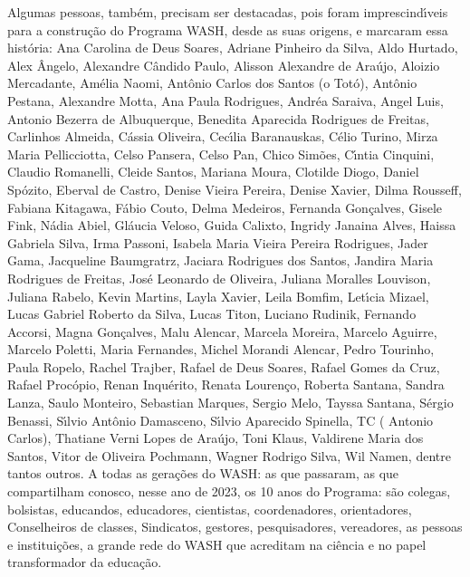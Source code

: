 \begin{agradecimentos}
Algumas pessoas, tamb\'em, precisam ser destacadas, pois foram imprescind\'{\i}veis para a constru\c{c}\~ao do Programa WASH, desde as suas origens, e marcaram essa hist\'oria: Ana Carolina de Deus Soares, Adriane Pinheiro da Silva, Aldo Hurtado, Alex \^Angelo, Alexandre C\^andido Paulo, Alisson Alexandre de Ara\'ujo, Aloizio Mercadante, Am\'elia Naomi, Ant\^onio Carlos dos Santos (o Tot\'o), Ant\^onio Pestana, Alexandre Motta, Ana Paula Rodrigues, Andr\'ea Saraiva, Angel Luis, Antonio Bezerra de Albuquerque, Benedita Aparecida Rodrigues de Freitas, Carlinhos Almeida, C\'assia Oliveira, Cec\'{\i}lia Baranauskas, C\'elio Turino, Mirza Maria Pellicciotta, Celso Pansera, Celso Pan, Chico Sim\~oes, C\'{\i}ntia Cinquini, Claudio Romanelli, Cleide Santos, Mariana Moura, Clotilde Diogo, Daniel Sp\'ozito, Eberval de Castro, Denise  Vieira Pereira, Denise Xavier, Dilma Rousseff,  Fabiana Kitagawa, F\'abio Couto, Delma  Medeiros, Fernanda Gon\c{c}alves, Gisele Fink, N\'adia Abiel, Gl\'aucia Veloso, Guida Calixto,  Ingridy Janaina Alves, Haissa Gabriela Silva, Irma Passoni, Isabela Maria Vieira Pereira Rodrigues, Jader Gama, Jacqueline Baumgratrz, Jaciara Rodrigues dos Santos, Jandira Maria Rodrigues de Freitas, Jos\'e Leonardo de Oliveira, Juliana Moralles Louvison, Juliana Rabelo, Kevin Martins, Layla Xavier, Leila Bomfim, Let\'{\i}cia Mizael, Lucas Gabriel Roberto da Silva, Lucas Titon, Luciano Rudinik, Fernando Accorsi, Magna Gon\c{c}alves, Malu Alencar, Marcela Moreira, Marcelo Aguirre, Marcelo Poletti, Maria Fernandes, Michel Morandi Alencar, Pedro Tourinho, Paula Ropelo, Rachel Trajber, Rafael de Deus Soares, Rafael Gomes da Cruz, Rafael Proc\'opio, Renan Inqu\'erito, Renata Louren\c{c}o, Roberta Santana,  Sandra Lanza, Saulo Monteiro, Sebastian Marques, Sergio Melo, Tayssa Santana,  S\'ergio Benassi, S\'{\i}lvio Ant\^onio Damasceno, S\'{\i}lvio Aparecido Spinella, TC ( Antonio Carlos), Thatiane Verni Lopes de Ara\'ujo, Toni Klaus, Valdirene Maria dos Santos, Vitor de Oliveira Pochmann, Wagner Rodrigo Silva, Wil Namen, dentre tantos outros.
A todas as gera\c{c}\~oes do WASH: as que passaram, as que compartilham conosco, nesse ano de 2023, os 10 anos do Programa: s\~ao colegas, bolsistas, educandos, educadores, cientistas, coordenadores, orientadores, Conselheiros de classes, Sindicatos, gestores, pesquisadores, vereadores, as pessoas e institui\c{c}\~oes, a grande rede do WASH que acreditam na ci\^encia e no papel transformador da educa\c{c}\~ao.

\end{agradecimentos}
